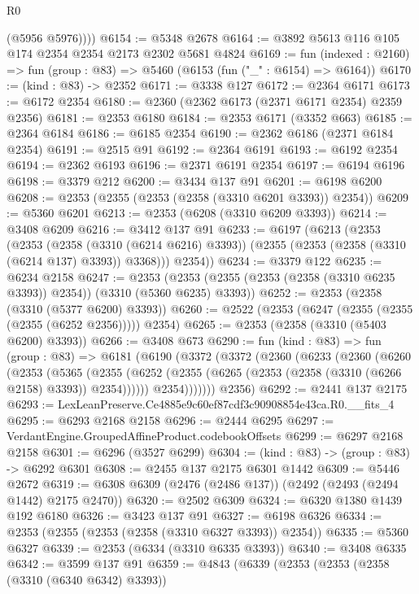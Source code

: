 \begin{lexlean}{R0}
\begin{coremodule}
          (@5956 @5976))))
@6154 := @5348 @2678
@6164 := @3892 @5613 @116 @105 @174 @2354 @2354 @2173 @2302 @5681 @4824
@6169 := fun (indexed : @2160) => fun (group : @83) => @5460 (@6153 (fun ("_" : @6154) => @6164))
@6170 := (kind : @83) -> @2352
@6171 := @3338 @127
@6172 := @2364 @6171
@6173 := @6172 @2354
@6180 := @2360 (@2362 @6173 (@2371 @6171 @2354) @2359 @2356)
@6181 := @2353 @6180
@6184 := @2353 @6171 (@3352 @663)
@6185 := @2364 @6184
@6186 := @6185 @2354
@6190 := @2362 @6186 (@2371 @6184 @2354)
@6191 := @2515 @91
@6192 := @2364 @6191
@6193 := @6192 @2354
@6194 := @2362 @6193
@6196 := @2371 @6191 @2354
@6197 := @6194 @6196
@6198 := @3379 @212
@6200 := @3434 @137 @91
@6201 := @6198 @6200
@6208 := @2353 (@2355 (@2353 (@2358 (@3310 @6201 @3393)) @2354))
@6209 := @5360 @6201
@6213 := @2353 (@6208 (@3310 @6209 @3393))
@6214 := @3408 @6209
@6216 := @3412 @137 @91
@6233 := @6197
    (@6213
      (@2353
        (@2353
          (@2358 (@3310 (@6214 @6216) @3393))
          (@2355 (@2353 (@2358 (@3310 (@6214 @137) @3393)) @3368)))
        @2354))
@6234 := @3379 @122
@6235 := @6234 @2158
@6247 := @2353 (@2353 (@2355 (@2353 (@2358 (@3310 @6235 @3393)) @2354)) (@3310 (@5360 @6235) @3393))
@6252 := @2353 (@2358 (@3310 (@5377 @6200) @3393))
@6260 := @2522 (@2353 (@6247 (@2355 (@2355 (@2355 (@6252 @2356))))) @2354)
@6265 := @2353 (@2358 (@3310 (@5403 @6200) @3393))
@6266 := @3408 @673
@6290 := fun (kind : @83) =>
  fun (group : @83) =>
  @6181
    (@6190
      (@3372
        (@3372
          (@2360
            (@6233
              (@2360
                (@6260
                  (@2353
                    (@5365
                      (@2355
                        (@6252 (@2355 (@6265 (@2353 (@2358 (@3310 (@6266 @2158) @3393)) @2354))))))
                    @2354)))))))
      @2356)
@6292 := @2441 @137 @2175
@6293 := LexLeanPreserve.Ce4885e9c60ef87cdf3c90908854e43ca.R0.__fits_4
@6295 := @6293 @2168 @2158
@6296 := @2444 @6295
@6297 := VerdantEngine.GroupedAffineProduct.codebookOffsets
@6299 := @6297 @2168 @2158
@6301 := @6296 (@3527 @6299)
@6304 := (kind : @83) -> (group : @83) -> @6292 @6301
@6308 := @2455 @137 @2175 @6301 @1442
@6309 := @5446 @2672
@6319 := @6308 @6309 (@2476 (@2486 @137)) (@2492 (@2493 (@2494 @1442) @2175 @2470))
@6320 := @2502 @6309
@6324 := @6320 @1380 @1439 @192 @6180
@6326 := @3423 @137 @91
@6327 := @6198 @6326
@6334 := @2353 (@2355 (@2353 (@2358 (@3310 @6327 @3393)) @2354))
@6335 := @5360 @6327
@6339 := @2353 (@6334 (@3310 @6335 @3393))
@6340 := @3408 @6335
@6342 := @3599 @137 @91
@6359 := @4843
    (@6339
      (@2353
        (@2353
          (@2358 (@3310 (@6340 @6342) @3393))

\end{coremodule}
\end{lexlean}

